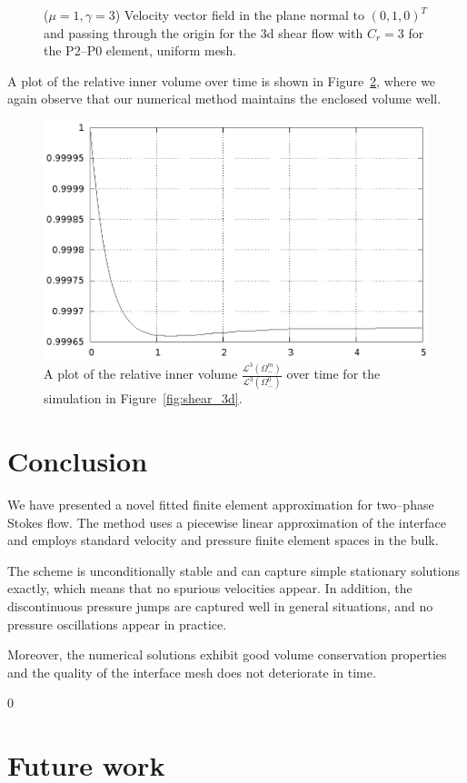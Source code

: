 \documentclass[a4paper,11pt,onecolumn]{article}
\begin{document}
\begin{figure}[htbp]
\centering
{}
\caption{($\mu=1,\gamma=3$) Velocity vector field in the plane normal to
$(0,1,0)^T$ and passing through the origin for the 3d shear flow with $C_r=3$
for the P2--P0 element, uniform mesh.}
\label{fig:shear_3d_velocity}
\end{figure}
A plot of the relative inner volume over time is shown in
Figure~\ref{fig:shear_3d_bulk_inner_volume}, where we again observe that our
numerical method maintains the enclosed volume well.

\begin{figure}[htbp]
\centering
\includegraphics[width=.45\textwidth]
{../stokes/figures/3d_shear_bulk_inner_volume.ps}
\caption{A plot of the relative inner volume
$\frac{\mathcal{L}^3(\Omega^m_-)}{\mathcal{L}^3(\Omega^0_-)}$
over time for the simulation in Figure~\ref{fig:shear_3d}.}
\label{fig:shear_3d_bulk_inner_volume}
\end{figure}

\section{Conclusion}\label{sec:conclusion}
We have presented a novel fitted finite element approximation for two--phase
Stokes flow. The method uses a piecewise linear approximation of the interface
and employs standard velocity and pressure finite element spaces in the bulk.

The scheme is unconditionally stable and can capture simple stationary
solutions exactly, which means that no spurious velocities appear. In addition,
the discontinuous pressure jumps are captured well in general situations, and
no pressure oscillations appear in practice.

Moreover, the numerical solutions exhibit good volume conservation properties
and the quality of the interface mesh does not deteriorate in time.

\setcounter{equation} 0
\section{Future work}
\end{document}
